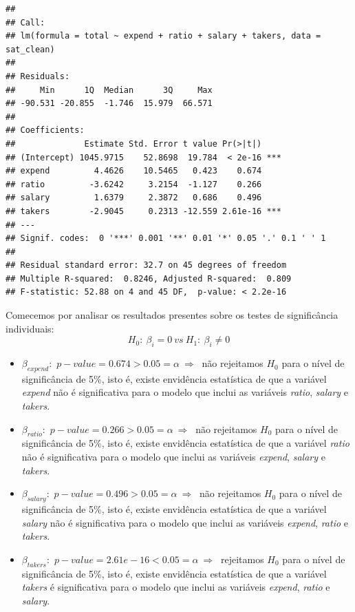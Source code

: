 \documentclass[]{article}
\begin{document}
\begin{verbatim}
## 
## Call:
## lm(formula = total ~ expend + ratio + salary + takers, data = sat_clean)
## 
## Residuals:
##     Min      1Q  Median      3Q     Max 
## -90.531 -20.855  -1.746  15.979  66.571 
## 
## Coefficients:
##              Estimate Std. Error t value Pr(>|t|)    
## (Intercept) 1045.9715    52.8698  19.784  < 2e-16 ***
## expend         4.4626    10.5465   0.423    0.674    
## ratio         -3.6242     3.2154  -1.127    0.266    
## salary         1.6379     2.3872   0.686    0.496    
## takers        -2.9045     0.2313 -12.559 2.61e-16 ***
## ---
## Signif. codes:  0 '***' 0.001 '**' 0.01 '*' 0.05 '.' 0.1 ' ' 1
## 
## Residual standard error: 32.7 on 45 degrees of freedom
## Multiple R-squared:  0.8246, Adjusted R-squared:  0.809 
## F-statistic: 52.88 on 4 and 45 DF,  p-value: < 2.2e-16
\end{verbatim}

Comecemos por analisar os resultados presentes sobre os testes de
significância individuais: \[
H_0:\ \beta_i=0\
vs\
H_1:\ \beta_i \neq 0
\]

\begin{itemize}
  \item $\beta_{expend}:$ $p-value = 0.674 > 0.05 = \alpha\ \Rightarrow\ $ não
rejeitamos $H_0$ para o nível de significância de 5\%, isto é, existe envidência
estatística de que a variável \textit{expend} não é significativa para o modelo
que inclui as variáveis \textit{ratio}, \textit{salary} e \textit{takers}.
  
  \item $\beta_{ratio}:$ $p-value = 0.266 > 0.05 = \alpha\ \Rightarrow\ $ não
rejeitamos $H_0$ para o nível de significância de 5\%, isto é, existe envidência
estatística de que a variável \textit{ratio} não é significativa para o modelo
que inclui as variáveis \textit{expend}, \textit{salary} e \textit{takers}.
  
  \item $\beta_{salary}:$ $p-value = 0.496 > 0.05 = \alpha\ \Rightarrow\ $ não
rejeitamos $H_0$ para o nível de significância de 5\%, isto é, existe envidência
estatística de que a variável \textit{salary} não é significativa para o modelo
que inclui as variáveis \textit{expend}, \textit{ratio} e \textit{takers}.
  
  \item $\beta_{takers}:$ $p-value = 2.61e-16 < 0.05 = \alpha\ \Rightarrow\ $ rejeitamos
$H_0$ para o nível de significância de 5\%, isto é, existe envidência estatística de que
a variável \textit{takers} é significativa para o modelo que inclui as variáveis
\textit{expend}, \textit{ratio} e \textit{salary}.
  
\end{itemize}
\end{document}
